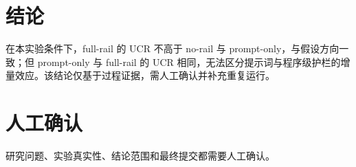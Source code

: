\documentclass[UTF8]{ctexart}
\begin{document}
\section{结论}
在本实验条件下，full-\allowbreak{}rail 的 UCR 不高于 no-\allowbreak{}rail 与 prompt-\allowbreak{}only，与假设方向一致；但 prompt-\allowbreak{}only 与 full-\allowbreak{}rail 的 UCR 相同，无法区分提示词与程序级护栏的增量效应。该结论仅基于过程证据，需人工确认并补充重复运行。
\section{人工确认}
研究问题、实验真实性、结论范围和最终提交都需要人工确认。
\end{document}
